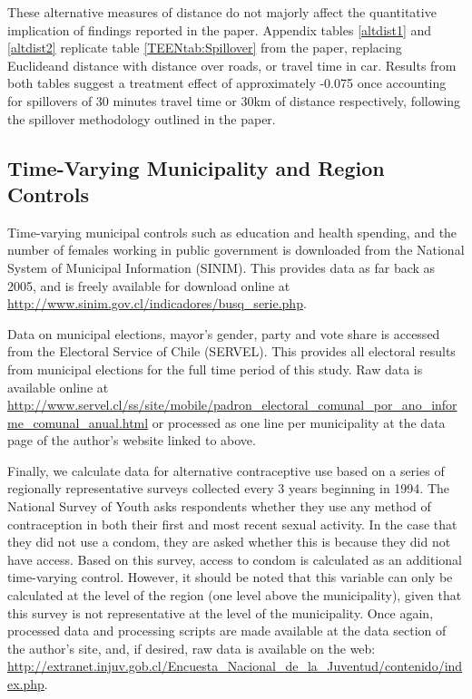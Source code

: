 \documentclass[11pt,subeqn]{article}
\begin{document}
\begin{spacing}{1.4}
These alternative measures of distance do not majorly affect the quantitative 
implication of findings reported in the paper.  Appendix tables \ref{altdist1}
and \ref{altdist2} replicate table \ref{TEENtab:Spillover} from the paper,
replacing Euclideand distance with distance over roads, or travel time in 
car. Results from both tables suggest a treatment effect of approximately 
-0.075 once accounting for spillovers of 30 minutes travel time or 30km of 
distance respectively, following the spillover methodology outlined in the
paper.

\clearpage
\subsection{Time-Varying Municipality and Region Controls}
Time-varying municipal controls such as education and health spending, and the
number of females working in public government is downloaded from the National
System of Municipal Information (SINIM).  This provides data as far back as
2005, and is freely available for download online at
\url{http://www.sinim.gov.cl/indicadores/busq_serie.php}.

Data on municipal elections, mayor's gender, party and vote share is accessed
from the Electoral Service of Chile (SERVEL).  This provides all electoral
results from municipal elections for the full time period of this study.  Raw
data is available online at 
\url{http://www.servel.cl/ss/site/mobile/padron_electoral_comunal_por_ano_informe_comunal_anual.html}
or processed as one line per municipality at the data page of the author's
website linked to above.

Finally, we calculate data for alternative contraceptive use based on
a series of regionally representative surveys collected every 3 years beginning
in 1994.  The National Survey of Youth asks respondents whether they use any 
method of contraception in both their first and most recent sexual activity.  
In the case that they did not use a condom, they are asked whether this is 
because they did not have access.  Based on this survey, access to condom is
calculated as an additional time-varying control.  However, it should be noted
that this variable can only be calculated at the level of the region (one 
level above the municipality), given that this survey is not representative at 
the level of the municipality.  Once again, processed data and processing 
scripts are made available at the data section of the author's site, and, if 
desired, raw data is available on the web: 
\url{http://extranet.injuv.gob.cl/Encuesta_Nacional_de_la_Juventud/contenido/index.php}.


\end{spacing}
\end{document}
